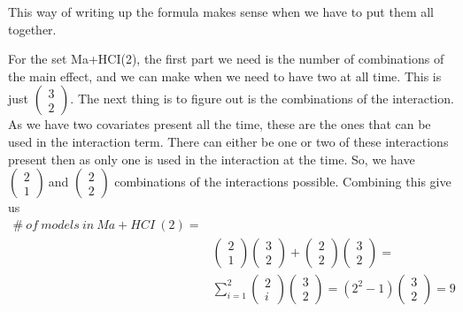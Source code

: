 This way of writing up the formula makes sense when we have to put them all together.

For the set Ma+HCI(2), the first part we need is the number of combinations of the main effect, and we can make when we need to have two at all time. This is just $\left( \begin{array}{c}
3 \\ 2 \end{array}\right)$. The next thing is to figure out is the combinations of the interaction. As we have two covariates present all the time, these are the ones that can be used in the interaction term. There can either be one or two of these interactions present then as only one is used in the interaction at the time. So, we have $\left( \begin{array}{c}
2 \\ 
1 \end{array}
\right)\ $and $\left( \begin{array}{c}
2 \\ 
2 \end{array}
\right)$ combinations of the interactions possible. Combining this give us
\begin{equation*}
\begin{aligned}
\#\ of\ models\ in\ Ma+HCI\ \left(2\right)=\\
& \left( \begin{array}{c}
2 \\ 
1 \end{array}
\right)\left( \begin{array}{c}
3 \\ 
2 \end{array}
\right)+\left( \begin{array}{c}
2 \\ 
2 \end{array}
\right)\left( \begin{array}{c}
3 \\ 
2 \end{array}
\right)=\\
&\sum^2_{i=1}{\left( \begin{array}{c}
2 \\ 
i \end{array}
\right)}\left( \begin{array}{c}
3 \\ 
2 \end{array}
\right)=\left(2^2-1\right)\left( \begin{array}{c}
3 \\ 
2 \end{array}
\right)=9

\end{aligned}
\end{equation*}
